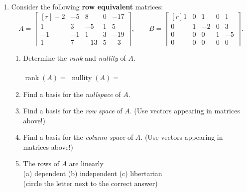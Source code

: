 \documentclass[12pt]{article}
\newcommand\rank{\ensuremath{\operatorname{rank}}}
\newcommand\nullity{\ensuremath{\operatorname{nullity}}}
\begin{document}
\begin{enumerate}
\newpage

\item Consider the following {\bf row equivalent} matrices:
\[
A = \begin{bmatrix*}[r]
  -2& -5& 8&	0& -17	\\
  1& 3& -5& 1&	5\\
  -1& -1& 1& 3& -19\\
  1& 7& -13& 5& -3
\end{bmatrix*},
\qquad
B = \begin{bmatrix*}[r]
  1&	0&	1&	0&	1	\\
  0&	1&	-2&	0&	3\\
  0&	0&	0&	1&	-5\\
  0&	0&	0&	0&	0
\end{bmatrix*}.
\]
\begin{enumerate}[{\bf a.}]
\item  Determine the {\it rank} and {\it nullity} of $A$.
\\
\\
\hskip1cm
$\rank(A) = $ \hskip3cm
$\nullity(A) = $
\vskip5mm
\item Find a basis for the {\it nullspace} of $A$.


\vskip5cm

\item Find a basis for the {\it row space} of $A$. (Use vectors appearing in matrices above!)


\vskip5cm



\item Find a basis for the {\it column space} of $A$. (Use vectors appearing in matrices above!)


\vskip5cm
\item The rows of $A$ are linearly\\[4pt]
(a) dependent \hfill (b) independent \hfill (c) libertarian\\[4pt]
(circle the letter next to the correct answer)

\end{enumerate}
\end{enumerate}
\end{document}
